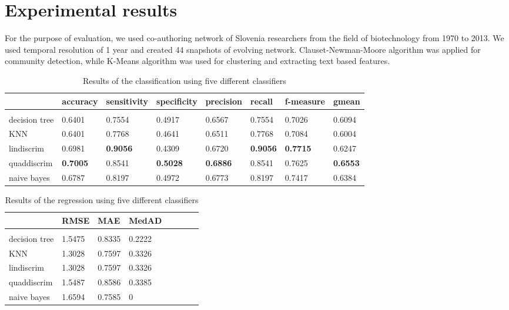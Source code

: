 \documentclass{article} %
\begin{document}
\section{Experimental results}

For the purpose of evaluation, we used co-authoring network of Slovenia researchers from the field of biotechnology from 1970 to 2013. We used temporal resolution of 1 year and created 44 snapshots of evolving network. Clauset-Newman-Moore algorithm was applied for community detection, while K-Means algorithm was used for clustering and extracting text based features.

\begin{table}[h]
\caption{Results of the classification using five different classifiers}
\label{classification}
\begin{center}
\begin{tabular}{@{}llllllll@{}}
                 & accuracy & sensitivity & specificity & precision & recall & f-measure & gmean \\
                 \hline \\
decision tree    & 0.6401   & 0.7554      & 0.4917      & 0.6567    & 0.7554 & 0.7026     & 0.6094 \\
KNN              & 0.6401   & 0.7768      & 0.4641      & 0.6511    & 0.7768 & 0.7084     & 0.6004 \\
lindiscrim       & 0.6981   & \textbf{0.9056}      & 0.4309      & 0.6720    & \textbf{0.9056} & \textbf{0.7715}     & 0.6247 \\
quaddiscrim      & \textbf{0.7005}   & 0.8541      & \textbf{0.5028}      & \textbf{0.6886}    & 0.8541 & 0.7625     & \textbf{0.6553} \\
naive bayes      & 0.6787   & 0.8197      & 0.4972      & 0.6773    & 0.8197 & 0.7417     & 0.6384 \\  
\end{tabular}
\end{center}
\end{table}

\begin{table}[h]
\caption{Results of the regression using five different classifiers}
\label{regression}
\begin{center}
\begin{tabular}{@{}llllllll@{}}
                 & RMSE & MAE & MedAD \\
                 \hline \\
decision tree	& 1.5475    & 0.8335    & 0.2222 \\
KNN             & 1.3028    & 0.7597    & 0.3326  \\
lindiscrim      & 1.3028    & 0.7597    & 0.3326 \\
quaddiscrim     & 1.5487    & 0.8586    & 0.3385 \\
naive bayes     & 1.6594    & 0.7585   	& 0 \\  
\end{tabular}
\end{center}
\end{table}
\end{document}
